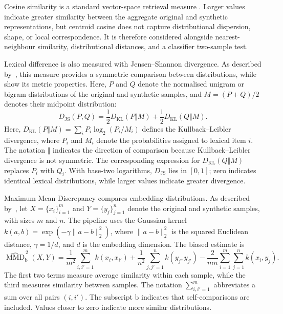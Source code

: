 Cosine similarity is a standard vector-space retrieval measure \cite{salton1988term}.
Larger values indicate greater similarity between the aggregate original and
synthetic representations, but centroid cosine does not capture distributional
dispersion, shape, or local correspondence. It is therefore considered alongside
nearest-neighbour similarity, distributional distances, and a classifier two-sample
test.

Lexical difference is also measured with Jensen--Shannon divergence. As described
by~\cite{lin1991divergence}, this measure provides a symmetric comparison between
distributions, while~\cite{endres2003new} show its metric properties. Here, $P$ and
$Q$ denote the normalised unigram or bigram distributions of the original and
synthetic samples, and $M=(P+Q)/2$ denotes their midpoint distribution:
\begin{equation}
D_{\mathrm{JS}}(P,Q)=
\frac{1}{2}D_{\mathrm{KL}}(P\Vert M)
+\frac{1}{2}D_{\mathrm{KL}}(Q\Vert M).
\label{eq:method-js-general}
\end{equation}
Here, $D_{\mathrm{KL}}(P\Vert M)=\sum_i P_i\log_2(P_i/M_i)$ defines the Kullback--Leibler divergence, where $P_i$ and
$M_i$ denote the probabilities assigned to lexical item $i$. The notation
$\Vert$ indicates the direction of comparison because Kullback--Leibler divergence
is not symmetric. The corresponding expression for $D_{\mathrm{KL}}(Q\Vert M)$
replaces $P_i$ with $Q_i$. With base-two logarithms, $D_{\mathrm{JS}}$ lies in
$[0,1]$; zero indicates identical lexical distributions, while larger values
indicate greater divergence.

Maximum Mean Discrepancy compares embedding distributions. As described
by~\cite{gretton2012kernel}, let $X=\{x_i\}_{i=1}^{m}$ and
$Y=\{y_j\}_{j=1}^{n}$ denote the original and synthetic samples, with sizes $m$
and $n$. The pipeline uses the Gaussian kernel
$k(a,b)=\exp(-\gamma\lVert a-b\rVert_2^2)$, where
$\lVert a-b\rVert_2^2$ is the squared Euclidean distance,
$\gamma=1/d$, and $d$ is the embedding dimension. The biased estimate is
\begin{equation}
\widehat{\operatorname{MMD}}_{\mathrm{b}}^{\,2}(X,Y)
=
\frac{1}{m^2}\sum_{i,i'=1}^{m}k(x_i,x_{i'})
+
\frac{1}{n^2}\sum_{j,j'=1}^{n}k(y_j,y_{j'})
-
\frac{2}{mn}\sum_{i=1}^{m}\sum_{j=1}^{n}k(x_i,y_j).
\label{eq:method-mmd}
\end{equation}
The first two terms measure average similarity within each sample, while the third
measures similarity between samples. The notation
$\sum_{i,i'=1}^{m}$ abbreviates a sum over all pairs $(i,i')$. The subscript
$\mathrm{b}$ indicates that self-comparisons are included. Values closer to zero
indicate more similar distributions. 

